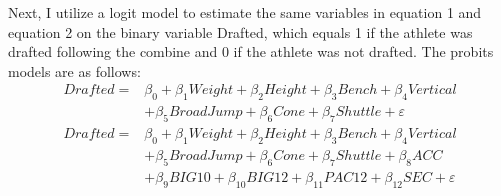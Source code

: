 \documentclass[12pt,english]{article}
\begin{document}
Next, I utilize a logit model to estimate the same variables in equation 1 and equation 2 on the binary variable Drafted, which equals 1 if the athlete was drafted following the combine and 0 if the athlete was not drafted. The probits models are as follows: 
\begin{equation}
\label{eq:3}
\begin{split}
    Drafted = & \beta_{0} + \beta_{1}Weight + \beta_{2}Height + \beta_{3}Bench + \beta_{4}Vertical \\ & + \beta_{5}BroadJump + \beta_{6}Cone + \beta_{7}Shuttle + \varepsilon
\end{split}
\end{equation}
\begin{equation}
\label{eq:4}
\begin{split}
    Drafted = & \beta_{0} + \beta_{1}Weight + \beta_{2}Height + \beta_{3}Bench + \beta_{4}Vertical \\ & + \beta_{5}BroadJump + \beta_{6}Cone + \beta_{7}Shuttle + \beta_{8}ACC \\ & + \beta_{9}BIG10 + \beta_{10}BIG12 + \beta_{11}PAC12 + \beta_{12}SEC + \varepsilon
\end{split}
\end{equation}
\end{document}

